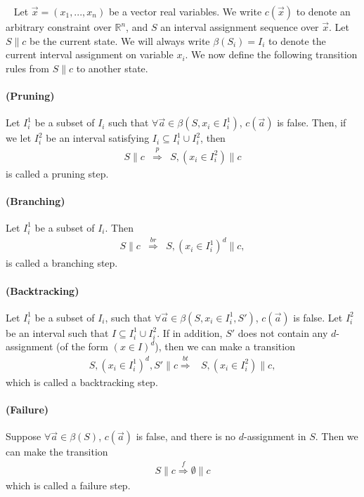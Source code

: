 \documentclass{llncs}
\begin{document}
\begin{definition}~\label{transitions} Let $\vec x =
(x_1,...,x_n)$ be a vector real variables. We write $c(\vec x)$ to denote an
arbitrary constraint over $\mathbb{R}^n$, and
$S$ an interval assignment sequence over $\vec x$. Let $S\parallel c$ be the
current state. We will always write $\beta(S_i) = I_i$ to denote the current
interval assignment on variable $x_i$. We now define the following transition
rules from $S\parallel c$ to another state.
\paragraph{(Pruning)} Let $I_i^1$ be a subset of $I_i$ such that $\forall \vec
a\in \beta(S,x_i\in I_i^1)$, $c(\vec a)$ is false. Then, if we let $I_i^2$ be an
interval satisfying $I_i\subseteq I_i^1 \cup I_i^2$, then
\begin{eqnarray*}
S\parallel c &\stackrel{p}{\Longrightarrow}& S, (x_i\in I_i^2)\parallel c
\end{eqnarray*}
is called a pruning step.
\paragraph{(Branching)}Let $I_i^1$ be a subset of $I_i$. Then
\begin{eqnarray*}
S\parallel c &\stackrel{br}{\Longrightarrow}& S, (x_i\in I_i^1)^d \parallel c,
\end{eqnarray*}
is called a branching step.

\paragraph{(Backtracking)} Let $I_i^1$ be a subset of $I_i$, such that $\forall
\vec a\in \beta(S,x_i\in I_i^1, S')$, $c(\vec a)$ is false. Let $I_i^2$ be an
interval such that $I\subseteq I_i^1\cup I_i^2$. If in addition, $S'$ does not
contain any $d$-assignment (of the form $(x\in I)^d$), then we can make
a transition
\begin{eqnarray*}
S, (x_i\in I_i^1)^d, S'\parallel c \stackrel{bt}{\Longrightarrow}& S, (x_i\in
 I_i^2) \parallel c,
\end{eqnarray*}
which is called a backtracking step.

\paragraph{(Failure)} Suppose $\forall \vec a\in \beta(S)$, $c(\vec a)$ is
false, and there is no $d$-assignment in $S$. Then we can make the transition
\begin{eqnarray*}
S\parallel c \stackrel{f}{\Longrightarrow} \emptyset\parallel c
\end{eqnarray*}
which is called a failure step.
\end{definition}
\end{document}
